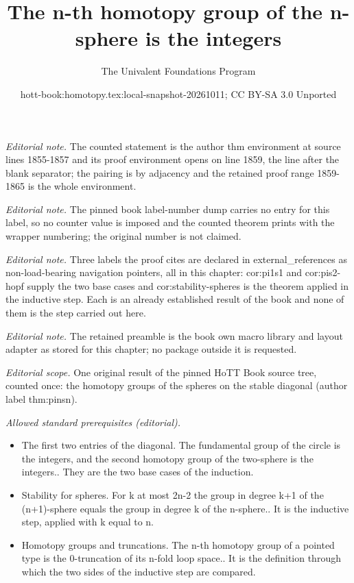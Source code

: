 \documentclass[10pt,a4paper]{article}
\title{The n-th homotopy group of the n-sphere is the integers}
\author{The Univalent Foundations Program}
\date{hott-book:homotopy.tex:local-snapshot-20261011; CC BY-SA 3.0 Unported}
\newcounter{chapter}
\theoremstyle{definition}
\theoremstyle{remark}
\numberwithin{equation}{section}
\begin{document}
\maketitle
\noindent\textit{Editorial note.} The counted statement is the author thm environment at source lines 1855-1857 and its proof environment opens on line 1859, the line after the blank separator; the pairing is by adjacency and the retained proof range 1859-1865 is the whole environment.\par\medskip
\noindent\textit{Editorial note.} The pinned book label-number dump carries no entry for this label, so no counter value is imposed and the counted theorem prints with the wrapper numbering; the original number is not claimed.\par\medskip
\noindent\textit{Editorial note.} Three labels the proof cites are declared in external\_references as non-load-bearing navigation pointers, all in this chapter: cor:pi1s1 and cor:pis2-hopf supply the two base cases and cor:stability-spheres is the theorem applied in the inductive step. Each is an already established result of the book and none of them is the step carried out here.\par\medskip
\noindent\textit{Editorial note.} The retained preamble is the book own macro library and layout adapter as stored for this chapter; no package outside it is requested.\par\medskip
\noindent\textit{Editorial scope.} One original result of the pinned HoTT Book source tree, counted once: the homotopy groups of the spheres on the stable diagonal (author label thm:pinsn).\par\medskip
\noindent\textit{Allowed standard prerequisites (editorial).}\begin{itemize}
\item The first two entries of the diagonal. The fundamental group of the circle is the integers, and the second homotopy group of the two-sphere is the integers.. They are the two base cases of the induction.
\item Stability for spheres. For k at most 2n-2 the group in degree k+1 of the (n+1)-sphere equals the group in degree k of the n-sphere.. It is the inductive step, applied with k equal to n.
\item Homotopy groups and truncations. The n-th homotopy group of a pointed type is the 0-truncation of its n-fold loop space.. It is the definition through which the two sides of the inductive step are compared.
\end{itemize}\medskip
\end{document}
